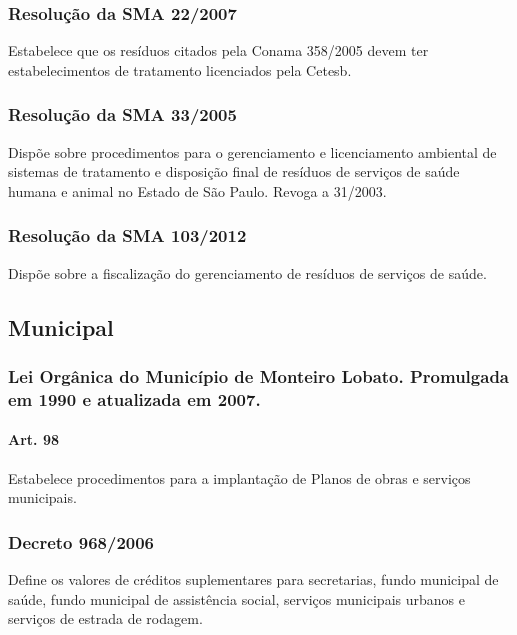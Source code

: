 \begin{subapend}
\begin{subsubapend}
		\subsubsection{Resolução da SMA 22/2007}
		Estabelece que os resíduos citados pela Conama 358/2005 devem ter estabelecimentos de tratamento licenciados pela Cetesb.
		\subsubsection{Resolução da SMA 33/2005}
		Dispõe sobre procedimentos para o gerenciamento e licenciamento ambiental de sistemas de tratamento e disposição final de resíduos de serviços de saúde humana e animal no Estado de São Paulo. Revoga a 31/2003.
		\subsubsection{Resolução da SMA 103/2012}
		Dispõe sobre a fiscalização do gerenciamento de resíduos de serviços de saúde.
	\end{subsubapend}
\end{subapend}


\begin{subapend}
	\subsection{Municipal}
	\begin{subsubapend}
		\item \subsubsection{Lei Orgânica do Município de Monteiro Lobato. Promulgada em 1990 e atualizada em 2007.}
		\paragraph{Art. 98} Estabelece procedimentos para a implantação de Planos de obras e serviços municipais.
		\subsubsection{Decreto 968/2006}
		Define os valores de créditos suplementares para secretarias, fundo municipal de saúde, fundo municipal de assistência social, serviços municipais urbanos e serviços de estrada de rodagem.
	\end{subsubapend}
\end{subapend}


